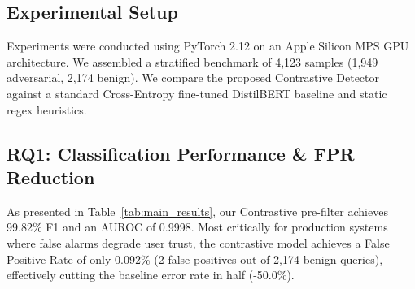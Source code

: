 \documentclass[conference]{IEEEtran}
\begin{document}
\subsection{Experimental Setup}
Experiments were conducted using PyTorch 2.12 on an Apple Silicon MPS GPU architecture. We assembled a stratified benchmark of 4,123 samples (1,949 adversarial, 2,174 benign). We compare the proposed Contrastive Detector against a standard Cross-Entropy fine-tuned DistilBERT baseline and static regex heuristics.

\begin{table}[t]
\caption{Empirical Model Performance on Benchmark ($N = 4,123$ Test Samples)}
\label{tab:main_results}
\centering
{}
\end{table}

\subsection{RQ1: Classification Performance \& FPR Reduction}
As presented in Table~\ref{tab:main_results}, our Contrastive pre-filter achieves 99.82\% F1 and an AUROC of 0.9998. Most critically for production systems where false alarms degrade user trust, the contrastive model achieves a False Positive Rate of only 0.092\% (2 false positives out of 2,174 benign queries), effectively cutting the baseline error rate in half (-50.0\%).
\end{document}
